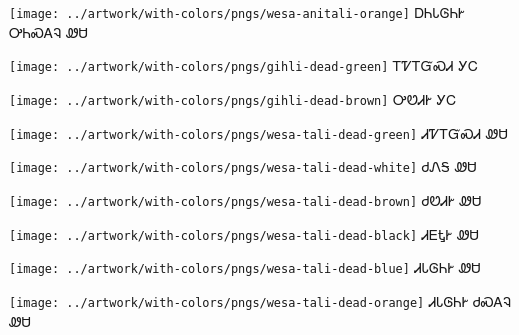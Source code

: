 \documentclass[avery5371]{flashcards}%
\begin{document}
    \begin{flashcard}{
        \texttt{[image: ../artwork/with-colors/pngs/wesa-anitali-orange]}
    }
        \Huge ᎠᏂᏓᎶᏂᎨ ᎤᏂᏍᎪᎸ ᏪᏌ
    \end{flashcard}

    \begin{flashcard}{
        \texttt{[image: ../artwork/with-colors/pngs/gihli-dead-green]}
    }
        \Huge ᎢᏤᎢᏳᏍᏗ ᎩᏟ
    \end{flashcard}

    \begin{flashcard}{
        \texttt{[image: ../artwork/with-colors/pngs/gihli-dead-brown]}
    }
        \Huge ᎤᏬᏗᎨ ᎩᏟ
    \end{flashcard}

    \begin{flashcard}{
        \texttt{[image: ../artwork/with-colors/pngs/wesa-tali-dead-green]}
    }
        \Huge ᏗᏤᎢᏳᏍᏗ ᏪᏌ
    \end{flashcard}

    \begin{flashcard}{
        \texttt{[image: ../artwork/with-colors/pngs/wesa-tali-dead-white]}
    }
        \Huge ᏧᏁᎦ ᏪᏌ
    \end{flashcard}
    \begin{flashcard}{
        \texttt{[image: ../artwork/with-colors/pngs/wesa-tali-dead-brown]}
    }
        \Huge ᏧᏬᏗᎨ ᏪᏌ
    \end{flashcard}
    \begin{flashcard}{
        \texttt{[image: ../artwork/with-colors/pngs/wesa-tali-dead-black]}
    }
        \Huge ᏗᎬᎿᎨ ᏪᏌ
    \end{flashcard}
    \begin{flashcard}{
        \texttt{[image: ../artwork/with-colors/pngs/wesa-tali-dead-blue]}
    }
        \Huge ᏗᏓᎶᏂᎨ ᏪᏌ
    \end{flashcard}
    \begin{flashcard}{
        \texttt{[image: ../artwork/with-colors/pngs/wesa-tali-dead-orange]}
    }
        \Huge ᏗᏓᎶᏂᎨ ᏧᏍᎪᎸ ᏪᏌ
    \end{flashcard}
\end{document}
